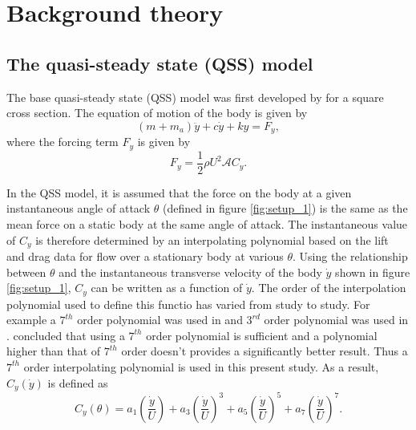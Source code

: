 
\section{Background theory}
\label{sec:theory}

\subsection{The quasi-steady state (QSS) model}

The base quasi-steady state (QSS) model was first developed by \citet{Parkinson1964} for a square cross section. The equation of motion of the body  is given by 
\begin{equation}
\label{equationofmotion}
(m+m_a)\ddot{y}+c\dot{y}+ky=F_y,
\end{equation}
where the forcing term $F_y$ is given by
\begin{equation}
\label{lift equation}
F_y=\frac{1}{2}\rho U^2\mathcal{A}C_y.
\end{equation}
 


In the QSS model, it is assumed that the force on the body at a given instantaneous angle of attack $\theta$ (defined in figure \ref{fig:setup_1}) is the same as the mean force on a static body at the same angle of attack. The instantaneous value of $C_y$ is therefore determined by an interpolating polynomial based on the lift and drag data  for flow over a stationary body at various $\theta$. Using the relationship between $\theta$ and the instantaneous transverse velocity of the body $\dot{y}$ shown in figure \ref{fig:setup_1}, $C_y$ can be written as a function of $\dot{y}$. The order of the interpolation polynomial used to define this functio has varied from study to study. For  example a $7^{th}$ order polynomial was used in \cite{Parkinson1964} and $3^{rd}$ order polynomial was used in \cite{Barrero-Gil2009}. \cite{Ng2005} concluded that using a $7^{th}$ order polynomial is sufficient and a polynomial higher than that of $7^{th}$ order doesn't provides a significantly better result. Thus a $7 ^{th}$ order interpolating polynomial is used in this present study. As a result, $C_y(\dot{y})$ is defined as
\begin{equation}
\label{cy ploynomial}
C_y(\theta)=a_1\left(\frac{\dot{y}}{U}\right)+a_3\left(\frac{\dot{y}}{U}\right)^3+a_5\left(\frac{\dot{y}}{U}\right)^5+a_7\left(\frac{\dot{y}}{U}\right)^7.
\end{equation}

